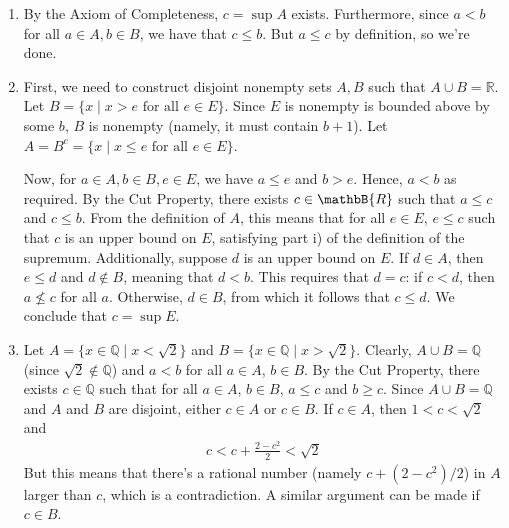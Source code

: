 \documentclass[a4paper]{report}
\newenvironment{ex}[1]
    {\noindent{\large \bf Exercise #1.}}{\newline}
\begin{document}
\begin{ex}{1.3.10}
\begin{enumerate}[label=\alph*)]
\item By the Axiom of Completeness, $c = \sup A$ exists. Furthermore, since $a <
  b$ for all $a \in A, b \in B$, we have that $c \leq b$. But
  $a \leq c$ by definition, so we're done.
\item First, we need to construct disjoint nonempty sets $A, B$ such that $A
  \cup B = \mathbb{R}$. Let $B = \{ x \mid x > e \text{ for all } e \in E\}$.
  Since $E$ is nonempty is bounded above by some $b$, $B$ is nonempty (namely,
  it must contain $b + 1$). Let $A = B^c = {\{ x \mid x \leq e \text{ for all } e
  \in E \}}$. 


  Now, for $a \in A, b \in B, e \in E$, we have $a \leq e$ and $b > e$. Hence,
  $a < b$ as required. By the Cut Property, there exists $c \in \mathbB{R}$ such
  that $a \leq c$ and $c \leq b$. From the definition of $A$, this means that
  for all $e \in E$, $e \leq c$ such that $c$ is an upper bound on $E$, 
  satisfying part i) of the definition of the supremum. Additionally, suppose
  $d$ is an upper bound on $E$. If $d \in A$, then $e \leq d$ and $d
  \notin B$, meaning that $d < b$. This requires that $d = c$: if $c < d$, then
  $a \not\leq c$ for all $a$. Otherwise, $d \in B$, from which it follows that
  $c \leq d.$ We conclude that $c = \sup E$.

\item Let $A = \{ x \in \mathbb{Q} \mid x < \sqrt{2} \}$ and $B = \{x \in
  \mathbb{Q} \mid x > \sqrt{2}\}$. Clearly, $A \cup B = \mathbb{Q}$ (since
  $\sqrt{2} \notin \mathbb{Q}$) and $a < b$
  for all $a \in A$, $b \in B$. By the Cut Property, there exists $c \in
  \mathbb{Q}$ such that for all $a \in A$, $b \in B$, $a \leq c$ and $b \geq c$.
  Since $A \cup B = \mathbb{Q}$ and $A$ and $B$ are disjoint, either $c \in A$
  or $c \in B$. If $c \in A$, then $1 < c < \sqrt{2}$ and
\begin{align*}
c < c + \frac{2 - c^2}{2}  < \sqrt{2} 
\end{align*}
But this means that there's a rational number (namely $c + (2 - c^2)/2$) in $A$ larger
than $c$, which is a contradiction. A similar argument can be made if $c \in B$.
\end{enumerate}
\end{ex}
\end{document}
